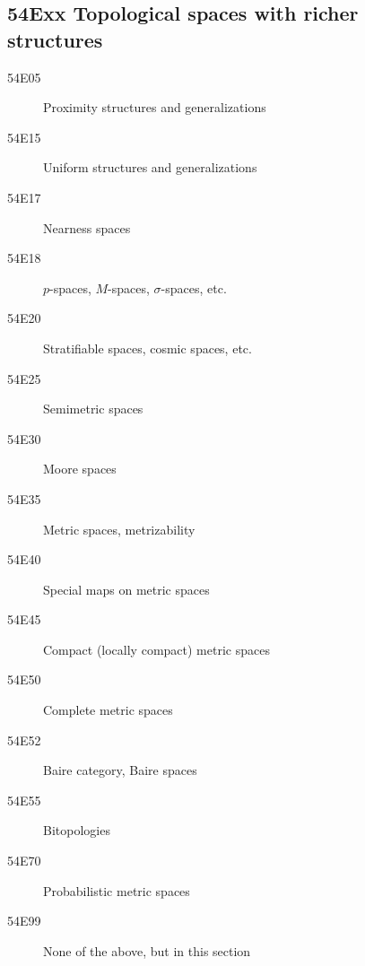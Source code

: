 \documentclass[letterpaper]{article}
\begin{document}
\subsection*{54Exx  Topological spaces with richer structures }\label{54Exx}
\begin{description}  
\item [54E05]\label{54E05} Proximity structures and generalizations
\item [54E15]\label{54E15} Uniform structures and generalizations
\item [54E17]\label{54E17} Nearness spaces
\item [54E18]\label{54E18} $p$-spaces, $M$-spaces, $\sigma$-spaces, etc.
\item [54E20]\label{54E20} Stratifiable spaces, cosmic spaces, etc.
\item [54E25]\label{54E25} Semimetric spaces
\item [54E30]\label{54E30} Moore spaces
\item [54E35]\label{54E35} Metric spaces, metrizability
\item [54E40]\label{54E40} Special maps on metric spaces
\item [54E45]\label{54E45} Compact (locally compact) metric spaces
\item [54E50]\label{54E50} Complete metric spaces
\item [54E52]\label{54E52} Baire category, Baire spaces
\item [54E55]\label{54E55} Bitopologies
\item [54E70]\label{54E70} Probabilistic metric spaces
\item [54E99]\label{54E99} None of the above, but in this section
\end{description}
\end{document}
